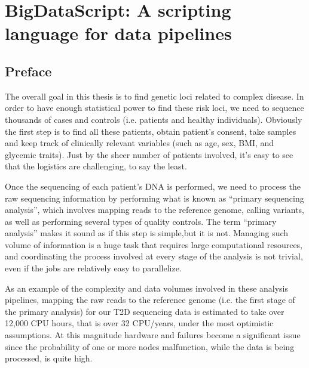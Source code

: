
\chapter{BigDataScript: A scripting language for data pipelines \label{ch:bds}}

\section{Preface}

The overall goal in this thesis is to find genetic loci related to complex disease. In order to have enough statistical power to find these risk loci, we need to sequence thousands of cases and controls (i.e. patients and healthy individuals). Obviously the first step is to find all these patients, obtain patient’s consent, take samples and keep track of clinically relevant variables (such as age, sex, BMI, and glycemic traits). Just by the sheer number of patients involved, it’s easy to see that the logistics are challenging, to say the least. 

Once the sequencing of each patient’s DNA is performed, we need to process the raw sequencing information by performing what is known as “primary sequencing analysis”, which involves mapping reads to the reference genome, calling variants, as well as performing several types of quality controls. The term “primary analysis” makes it sound as if this step is simple,but it is not.  Managing such volume of information is a huge task that requires large computational resources, and coordinating the process involved at every stage of the analysis is not trivial, even if the jobs are relatively easy to parallelize. 

As an example of the complexity and data volumes involved in these analysis pipelines, mapping the raw reads to the reference genome (i.e. the first stage of the primary analysis) for our T2D sequencing data is estimated to take over 12,000 CPU hours, that is over 32 CPU/years, under the most optimistic assumptions. At this magnitude hardware and failures become a significant issue since the probability of one or more nodes malfunction, while the data is being processed, is quite high.

